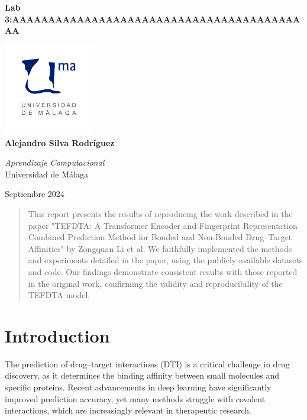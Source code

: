 \documentclass{article}
\begin{document}
\begin{titlepage}
	\centering
	\vspace*{3cm}
	
	{\Huge \textbf{Lab 3:AAAAAAAAAAAAAAAAAAAAAAAAAAAAAAAAAAAAAAAAAA}\\[0.5cm]}
	
	\vspace{2cm}
	\includegraphics[width=0.3\textwidth]{images/uma_logo.jpg}\\[1cm]
	
	{\LARGE \textbf{Alejandro Silva Rodríguez}\\[0.5cm]}

	{\large \textit{Aprendizaje Computacional}\\
		Universidad de Málaga\\
		}
	
	\vfill
	
	{\large Septiembre 2024}
\end{titlepage}

\tableofcontents

\newpage

\begin{abstract}
	This report presents the results of reproducing the work described in the paper "TEFDTA: A Transformer Encoder and Fingerprint Representation Combined Prediction Method for Bonded and Non-Bonded Drug–Target Affinities" by Zongquan Li et al. We faithfully implemented the methods and experiments detailed in the paper, using the publicly available datasets and code. Our findings demonstrate consistent results with those reported in the original work, confirming the validity and reproducibility of the TEFDTA model. 
\end{abstract}

\section{Introduction}
The prediction of drug–target interactions (DTI) is a critical challenge in drug discovery, as it determines the binding affinity between small molecules and specific proteins. Recent advancements in deep learning have significantly improved prediction accuracy, yet many methods struggle with covalent interactions, which are increasingly relevant in therapeutic research.
\\
\end{document}
